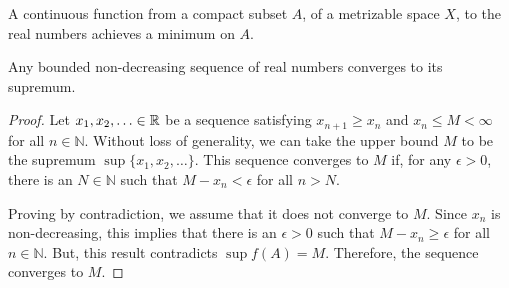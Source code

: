 \begin{corollary}
A continuous function from a compact subset $A$, of a metrizable space $X$, to the real numbers achieves a minimum on $A$.
\end{corollary}

\begin{theorem}
Any bounded non-decreasing sequence of real numbers converges to its supremum.
\end{theorem}
\begin{proof}
Let $x_1,x_2,\ldots \in \mathbb{R}$ be a sequence satisfying $x_{n+1} \geq x_n$ and $x_n \leq M < \infty$ for all $n\in \mathbb{N}$.
Without loss of generality, we can take the upper bound $M$ to be the supremum $\sup \{x_1,x_2,\ldots\}$.
This sequence converges to $M$ if, for any $\epsilon >0$, there is an $N\in \mathbb{N}$ such that $M-x_n<\epsilon$ for all $n>N$.

Proving by contradiction, we assume that it does not converge to $M$.
Since $x_n$ is non-decreasing, this implies that there is an $\epsilon > 0$ such that $M - x_n \geq \epsilon$ for all $n\in \mathbb{N}$.
But, this result contradicts $\sup f(A) = M$.
Therefore, the sequence converges to $M$.
\end{proof}


